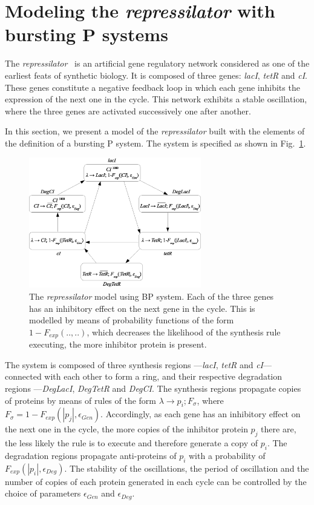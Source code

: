 \documentclass[runningheads,a4paper]{llncs}
\begin{document}
\section{Modeling the \textit{repressilator} with bursting P systems}
The \emph{repressilator}~\cite{Elowitz2000} is an artificial gene regulatory network considered as one of the earliest feats of synthetic biology. It is composed of three genes: \textit{lacI}, \textit{tetR} and \textit{cI}. These genes constitute a negative feedback loop in which each gene inhibits the expression of the next one in the cycle. This network exhibits a stable oscillation, where the three genes are activated successively one after another.

In this section, we present a model of the \emph{repressilator} built with the elements of the definition of a bursting P system. The system is specified as shown in Fig.~\ref{f:DiagRepress}.

\begin{figure}
\begin{center}
\includegraphics[width=0.67\textwidth]{DiagRepress}
\caption{The \textit{repressilator} model using BP system. Each of the three genes has an inhibitory effect on the next gene in the cycle. This is modelled by means of probability functions of the form $1-F_{exp}(..,..)$, which decreases the likelihood of the synthesis rule executing, the more inhibitor protein is present.}
\label{f:DiagRepress}
\end{center}
\end{figure}

The system is composed of three synthesis regions ---\textit{lacI}, \textit{tetR} and \textit{cI}--- connected with each other to form a ring, and their respective degradation regions ---\textit{DegLacI}, \textit{DegTetR} and \textit{DegCI}. The synthesis regions propagate copies of proteins by means of rules of the form $\lambda \rightarrow p_i; F_\sigma$, where $F_\sigma=1-F_{exp}(|p_j|, \epsilon_{Gen})$. Accordingly, as each gene has an inhibitory effect on the next one in the cycle, the more copies of the inhibitor protein $ p_j$ there are, the less likely the rule is to execute and therefore generate a copy of $p_i$. The degradation regions propagate anti-proteins of $p_i$ with a probability of $F_{exp}(|p_i|, \epsilon_{Deg} )$. The stability of the oscillations, the period of oscillation and the number of copies of each protein generated in each cycle can be controlled by the choice of parameters $\epsilon_{Gen}$ and $\epsilon_{Deg}$.
\end{document}
